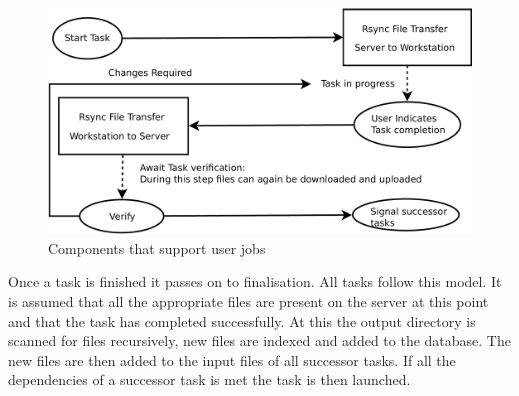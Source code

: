 \documentclass[12pt,a4paper]{report}
\begin{document}
\begin{figure}[!h]
    \begin{center}
        \includegraphics[scale=0.35]{figures/user_impl2.pdf}
    \end{center}
    \caption{Components that support user jobs}
    \label{user_task_impl2}
\end{figure}
    Once a task is finished it passes on to finalisation. All tasks follow this model. It
    is assumed that all the appropriate files are present on the server at this point and
    that the task has completed successfully. At this the output directory is scanned for
    files recursively, new files are indexed and added to the database. The new files are then
    added to the input files of all successor tasks. If all the dependencies of a successor
    task is met the task is then launched.
\end{document}
